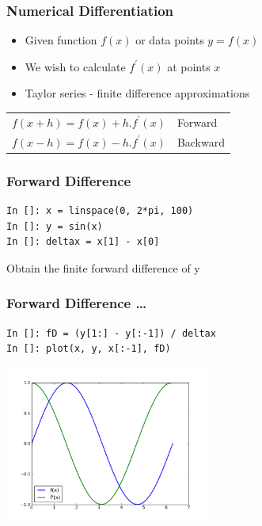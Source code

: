 \documentclass[14pt,compress]{beamer}
\begin{document}
\begin{frame}[fragile]
\frametitle{Numerical Differentiation}
\begin{itemize}
\item Given function $f(x)$ or data points $y=f(x)$
\item We wish to calculate $f^{'}(x)$ at points $x$
\item Taylor series - finite difference approximations
\end{itemize}
\begin{center}
\begin{tabular}{l l}
$f(x+h)=f(x)+h.f^{'}(x)$ &Forward \\
$f(x-h)=f(x)-h.f^{'}(x)$ &Backward
\end{tabular}
\end{center}
\end{frame}

\begin{frame}[fragile]
\frametitle{Forward Difference}
\begin{lstlisting}
In []: x = linspace(0, 2*pi, 100)
In []: y = sin(x)
In []: deltax = x[1] - x[0]
\end{lstlisting}
Obtain the finite forward difference of y
\end{frame}

\begin{frame}[fragile]
\frametitle{Forward Difference \ldots}
\begin{lstlisting}
In []: fD = (y[1:] - y[:-1]) / deltax
In []: plot(x, y, x[:-1], fD)
\end{lstlisting}
\begin{center}
  \includegraphics[height=2in, interpolate=true]{data/fwdDiff}
\end{center}
\end{frame}
\end{document}
